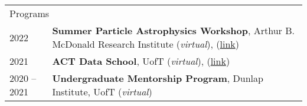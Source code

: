 \documentclass[10pt]{res} %
\begin{document}
\begin{resume}
\begin{table}[h]
\begin{tabularx}{\textwidth}{ @{} p{6.5em} X @{} }
\multicolumn{2}{l}{ \rule{0pt}{3ex} \large \hspace{-12pt} Programs \dotfill \rule[-1.2ex]{0pt}{0pt}} \\
2022 & \textbf{Summer Particle Astrophysics Workshop}, Arthur B. McDonald Research Institute (\textit{virtual}), (\href{https://indico.cern.ch/event/1151180/registrations/participants}{link}) \\
2021 & \textbf{ACT Data School}, UofT (\textit{virtual}),  (\href{https://sites.google.com/view/actdataschool/participants}{link}) \\
2020 -- 2021 & \textbf{Undergraduate Mentorship Program}, Dunlap Institute, UofT (\textit{virtual}) \\

\end{tabularx}
\end{table}


\end{resume}
\end{document}
